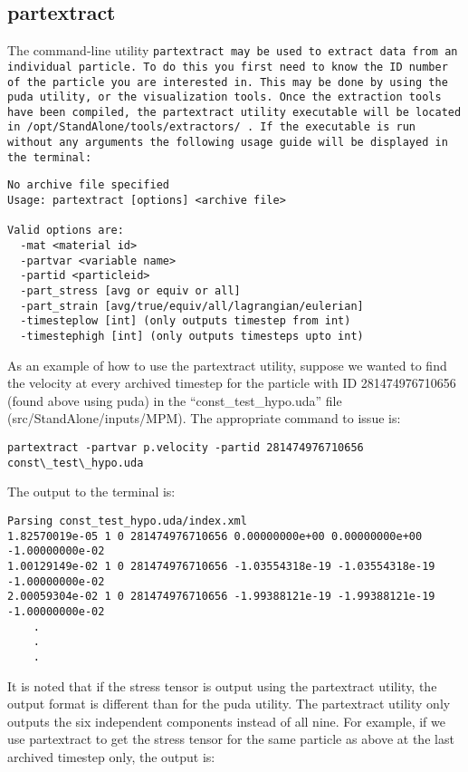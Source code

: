 \subsection{partextract}

The command-line utility \tt partextract \normalfont may be used to extract data from an individual particle.  To do this you first need to know the ID number of the particle you are interested in.  This may be done by using the puda utility, or the visualization tools.  Once the extraction tools have been compiled, the partextract utility executable will be located in  \tt /opt/StandAlone/tools/extractors/ \normalfont.  If the executable is run without any arguments the following usage guide will be displayed in the terminal:

\begin{Verbatim}[fontsize=\footnotesize]
No archive file specified
Usage: partextract [options] <archive file>

Valid options are:
  -mat <material id>
  -partvar <variable name>
  -partid <particleid>
  -part_stress [avg or equiv or all]
  -part_strain [avg/true/equiv/all/lagrangian/eulerian]
  -timesteplow [int] (only outputs timestep from int)
  -timestephigh [int] (only outputs timesteps upto int)
\end{Verbatim}

As an example of how to use the partextract utility, suppose we wanted to find the velocity at every archived timestep for the particle with ID 281474976710656 (found above using puda) in the ``const\_test\_hypo.uda'' file (src/StandAlone/inputs/MPM).  The appropriate command to issue is:

\begin{Verbatim}[fontsize=\footnotesize]
partextract -partvar p.velocity -partid 281474976710656 const\_test\_hypo.uda
\end{Verbatim}

The output to the terminal is:

\begin{Verbatim}[fontsize=\footnotesize]
Parsing const_test_hypo.uda/index.xml
1.82570019e-05 1 0 281474976710656 0.00000000e+00 0.00000000e+00 -1.00000000e-02
1.00129149e-02 1 0 281474976710656 -1.03554318e-19 -1.03554318e-19 -1.00000000e-02
2.00059304e-02 1 0 281474976710656 -1.99388121e-19 -1.99388121e-19 -1.00000000e-02
	.
	.
	.
\end{Verbatim}

It is noted that if the stress tensor is output using the partextract utility, the output format is different than for the puda utility.  The partextract utility only outputs the six independent components instead of all nine.  For example, if we use partextract to get the stress tensor for the same particle as above at the last archived timestep only, the output is:

